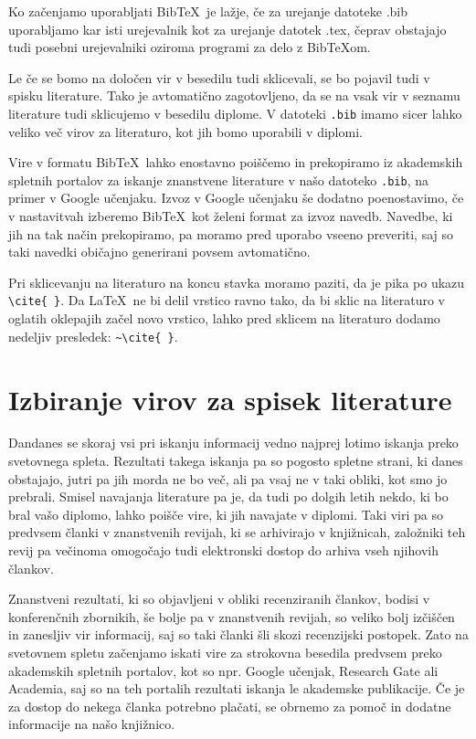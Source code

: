 \documentclass[a4paper, 12pt]{book}
\newcommand{\BibTeX}{{\sc Bib}\TeX}
\begin{document}
{{Ko začenjamo uporabljati \BibTeX\ je lažje, če za urejanje datoteke .bib uporabljamo kar isti urejevalnik kot za urejanje datotek .tex, 
čeprav obstajajo tudi posebni urejevalniki oziroma programi za delo z \BibTeX om.

Le če se bomo na določen vir v besedilu tudi sklicevali, se bo pojavil tudi v spisku literature.
Tako je avtomatično zagotovljeno, da se na vsak vir v seznamu literature tudi sklicujemo v besedilu diplome.
V datoteki \texttt{.bib} imamo sicer lahko veliko več virov za literaturo, kot jih bomo uporabili v diplomi.

Vire v formatu \BibTeX\ lahko enostavno poiščemo in prekopiramo iz akademskih spletnih portalov za iskanje znanstvene literature v našo datoteko \texttt{.bib}, na primer v Google učenjaku.
Izvoz v Google učenjaku še dodatno poenostavimo, če v nastavitvah izberemo \BibTeX\ kot želeni format za izvoz navedb.
Navedbe, ki jih na tak način prekopiramo, pa moramo pred uporabo vseeno preveriti, saj so taki navedki običajno generirani povsem avtomatično.

Pri sklicevanju na literaturo na koncu stavka moramo paziti, da je pika po ukazu \verb=\cite{ }=.
Da \LaTeX\ ne bi delil vrstico ravno tako, da bi sklic na literaturo v oglatih oklepajih začel novo vrstico, lahko pred sklicem na literaturo dodamo nedeljiv presledek: \verb=~\cite{ }=.


\section{Izbiranje virov za spisek literature}

Dandanes  se skoraj  vsi pri iskanju informacij vedno najprej lotimo iskanja preko svetovnega spleta.
Rezultati takega iskanja pa so pogosto spletne strani, ki danes obstajajo, jutri pa jih morda ne bo več, ali pa vsaj ne v taki obliki, kot smo jo prebrali.
Smisel navajanja literature pa je, da tudi po dolgih letih nekdo, ki bo bral vašo diplomo, lahko poišče vire, ki jih navajate v diplomi.
Taki viri pa so predvsem članki v znanstvenih revijah, ki se arhivirajo v knjižnicah, založniki teh revij pa večinoma omogočajo tudi elektronski dostop do arhiva vseh njihovih člankov.

Znanstveni rezultati, ki so objavljeni v obliki recenziranih člankov, bodisi v konferenčnih zbornikih, še bolje pa v znanstvenih revijah, so veliko bolj izčiščen in zanesljiv vir informacij, saj
so taki članki šli skozi recenzijski postopek.
Zato na svetovnem spletu začenjamo iskati vire za strokovna besedila predvsem preko akademskih spletnih portalov, kot so npr. Google učenjak, Research Gate ali Academia, saj
so na teh portalih rezultati iskanja le akademske publikacije.
Če je za dostop do nekega članka potrebno plačati, se obrnemo za pomoč in dodatne informacije na  našo knjižnico.

}}
\end{document}
